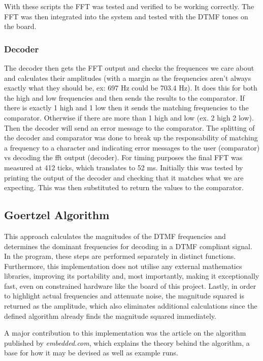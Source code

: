 \documentclass{cce2014-design}
\begin{document}
{{	  With these scripts the FFT was tested and verified to be
	  working correctly. The FFT was then integrated into the system and
	  tested with
	  the DTMF tones on the board.

	  \subsubsection{Decoder}
	  The decoder then gets the FFT output and checks the frequences
	  we care about and calculates their amplitudes (with a margin as the
	  frequencies
	  aren't always exactly what they should be, ex: 697 Hz could be 703.4
	  Hz).
	  It does this for both the high and low frequencies and then
	  sends the results to the comparator. If there is exactly 1 high and 1
	  low then
	  it sends the matching frequencies to the comparator. Otherwise if
	  there are
	  more than
	  1 high and low (ex. 2 high 2 low). Then the decoder will send
	  an error message to the comparator. The splitting of the decoder and
	  comparator
	  was done to break up the responsability of
	  matching a frequency to a character and indicating error
	  messages to the user (comparator) vs decoding the fft output
	  (decoder). For timing purposes the final FFT was measured at 412 ticks, which translates to 52 ms.
	  Initially this was tested by printing the output of the
	  decoder and checking that it matches what we are expecting. This was
	  then
	  substituted to return the values to the comparator.
  }
  \subsection{Goertzel Algorithm}
  
	This approach calculates the magnitudes of the DTMF frequencies and determines the dominant frequencies for decoding in a DTMF compliant signal.
	In the program, these steps are performed separately in distinct functions.
	Furthermore, this implementation does not utilise any external mathematics libraries, improving its portability and, most importantly, making it exceptionally fast, even on constrained hardware like the board of this project.
	Lastly, in order to highlight actual frequencies and attenuate noise, the magnitude squared is returned as the amplitude, which also eliminates additional calculations since the defined algorithm already finds the magnitude squared immediately.

	A major contribution to this implementation was the article on the algorithm published by \textit{embedded.com}, which explains the theory behind the algorithm, a base for how it may be devised as well as example runs. \cite{gtzl-embedded}

}
\end{document}
